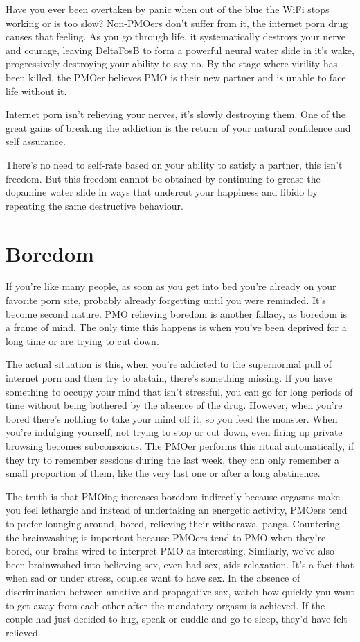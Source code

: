\documentclass[easypeasy.tex]{subfiles}
\begin{document}
Have you ever been overtaken by panic when out of the blue the WiFi stops working or is too slow? Non-PMOers don't suffer from it, the internet porn drug causes that feeling. As you go through life, it systematically destroys your nerve and courage, leaving DeltaFosB to form a powerful neural water slide in it's wake, progressively destroying your ability to say no. By the stage where virility has been killed, the PMOer believes PMO is their new partner and is unable to face life without it.

Internet porn isn't relieving your nerves, it's slowly destroying them. One of the great gains of breaking the addiction is the return of your natural confidence and self assurance.

There's no need to self-rate based on your ability to satisfy a partner, this isn't freedom. But this freedom cannot be obtained by continuing to grease the dopamine water slide in ways that undercut your happiness and libido by repeating the same destructive behaviour.

\section{Boredom}

If you're like many people, as soon as you get into bed you're already on your favorite porn site, probably already forgetting until you were reminded. It's become second nature. PMO relieving boredom is another fallacy, as boredom is a frame of mind. The only time this happens is when you've been deprived for a long time or are trying to cut down.

The actual situation is this, when you're addicted to the supernormal pull of internet porn and then try to abstain, there's something missing. If you have something to occupy your mind that isn't stressful, you can go for long periods of time without being bothered by the absence of the drug. However, when you're bored there's nothing to take your mind off it, so you feed the monster. When you're indulging yourself, not trying to stop or cut down, even firing up private browsing becomes subconscious. The PMOer performs this ritual automatically, if they try to remember sessions during the last week, they can only remember a small proportion of them, like the very last one or after a long abstinence.

The truth is that PMOing increases boredom indirectly because orgasms make you feel lethargic and instead of undertaking an energetic activity, PMOers tend to prefer lounging around, bored, relieving their withdrawal pangs. Countering the brainwashing is important because PMOers tend to PMO when they're bored, our brains wired to interpret PMO as interesting. Similarly, we've also been brainwashed into believing sex, even bad sex, aids relaxation. It's a fact that when sad or under stress, couples want to have sex. In the absence of discrimination between amative and propagative sex, watch how quickly you want to get away from each other after the mandatory orgasm is achieved. If the couple had just decided to hug, speak or cuddle and go to sleep, they'd have felt relieved.
\end{document}
